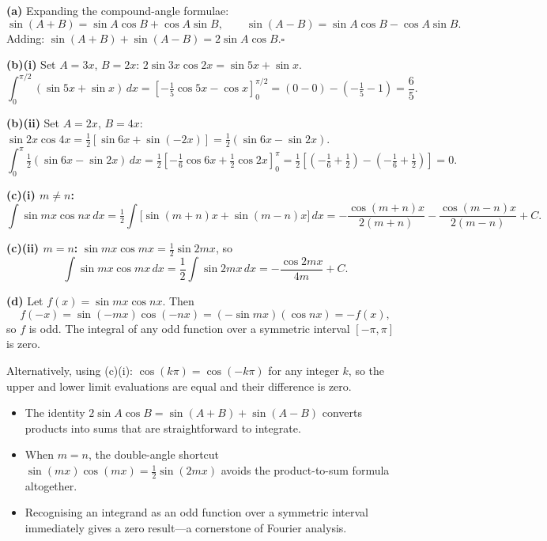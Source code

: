 \begin{solution}
\textbf{(a)} Expanding the compound-angle formulae:
\[
\sin(A+B) = \sin A\cos B + \cos A\sin B,
\qquad
\sin(A-B) = \sin A\cos B - \cos A\sin B.
\]
Adding: $\sin(A+B)+\sin(A-B) = 2\sin A\cos B$.\hfill$\square$

\textbf{(b)(i)} Set $A = 3x$, $B = 2x$: $2\sin 3x\cos 2x = \sin 5x + \sin x$.
\[
\int_0^{\pi/2}(\sin 5x+\sin x)\,dx
= \left[-\tfrac{1}{5}\cos 5x - \cos x\right]_0^{\pi/2}
= (0-0) - \!\left(-\tfrac{1}{5}-1\right) = \frac{6}{5}.
\]

\textbf{(b)(ii)} Set $A = 2x$, $B = 4x$: $\sin 2x\cos 4x = \tfrac{1}{2}[\sin 6x + \sin(-2x)]
= \tfrac{1}{2}(\sin 6x - \sin 2x)$.
\[
\int_0^{\pi}\tfrac{1}{2}(\sin 6x - \sin 2x)\,dx
= \tfrac{1}{2}\!\left[-\tfrac{1}{6}\cos 6x + \tfrac{1}{2}\cos 2x\right]_0^{\pi}
= \tfrac{1}{2}\!\left[\left(-\tfrac{1}{6}+\tfrac{1}{2}\right)-\left(-\tfrac{1}{6}+\tfrac{1}{2}\right)\right]
= 0.
\]

\textbf{(c)(i) $m \neq n$:}
\[
\int\sin mx\cos nx\,dx
= \tfrac{1}{2}\int\bigl[\sin(m+n)x + \sin(m-n)x\bigr]\,dx
= -\frac{\cos(m+n)x}{2(m+n)} - \frac{\cos(m-n)x}{2(m-n)} + C.
\]

\textbf{(c)(ii) $m = n$:} $\sin mx\cos mx = \tfrac{1}{2}\sin 2mx$, so
\[
\int\sin mx\cos mx\,dx = \frac{1}{2}\int\sin 2mx\,dx = -\frac{\cos 2mx}{4m} + C.
\]

\textbf{(d)} Let $f(x) = \sin mx\cos nx$. Then
\[
f(-x) = \sin(-mx)\cos(-nx) = (-\sin mx)(\cos nx) = -f(x),
\]
so $f$ is odd. The integral of any odd function over a symmetric interval $[-\pi,\pi]$ is zero.

Alternatively, using (c)(i): $\cos(k\pi) = \cos(-k\pi)$ for any integer $k$, so the upper and
lower limit evaluations are equal and their difference is zero.
\end{solution}

\begin{takeaways}
\begin{itemize}[leftmargin=*]
  \item The identity $2\sin A\cos B = \sin(A+B)+\sin(A-B)$ converts products into sums that
        are straightforward to integrate.
  \item When $m = n$, the double-angle shortcut $\sin(mx)\cos(mx) = \tfrac{1}{2}\sin(2mx)$
        avoids the product-to-sum formula altogether.
  \item Recognising an integrand as an odd function over a symmetric interval immediately gives
        a zero result---a cornerstone of Fourier analysis.
\end{itemize}
\end{takeaways}

